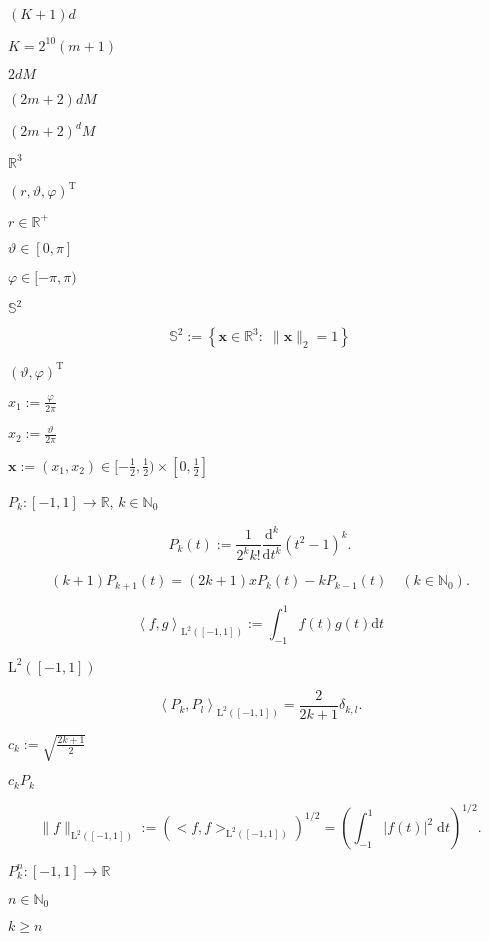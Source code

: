 \documentclass{article}
\begin{document}
$(K+1)d$
\pagebreak

$K=2^{10}(m+1)$
\pagebreak

$2dM$
\pagebreak

$(2m+2)dM$
\pagebreak

$(2m+2)^dM$
\pagebreak

$\mathbb{R}^3$
\pagebreak

$(r,\vartheta,\varphi)^{\mathrm{T}}$
\pagebreak

$r \in \mathbb{R}^{+}$
\pagebreak

$\vartheta \in [0,\pi]$
\pagebreak

$\varphi \in [-\pi,\pi)$
\pagebreak

$\mathbb{S}^2$
\pagebreak

\[ \mathbb{S}^2 := \left\{\mathbf{x} \in \mathbb{R}^{3}:\; \|\mathbf{x}\|_2=1\right\} \]
\pagebreak

$(\vartheta,\varphi)^{\mathrm{T}}$
\pagebreak

$x_1 := \frac{\varphi}{2\pi}$
\pagebreak

$x_2 := \frac{\vartheta}{2\pi}$
\pagebreak

$\mathbf{x} := \left(x_1,x_2\right) \in [-\frac{1}{2}, \frac{1}{2}) \times [0,\frac{1}{2}]$
\pagebreak

$P_k : [-1,1] \rightarrow \mathbb{R}$, $k \in \mathbb{N}_{0}$
\pagebreak

\[ P_k(t) := \frac{1}{2^k k!} \frac{\text{d}^k}{\text{d} t^k} \left(t^2-1\right)^k. \]
\pagebreak

\[ (k+1)P_{k+1}(t) = (2k+1) x P_{k}(t) - k P_{k-1}(t) \quad (k \in \mathbb{N}_0). \]
\pagebreak

\[ \left< f,g \right>_{\text{L}^2\left([-1,1]\right)} := \int_{-1}^{1} f(t) g(t) \text{d} t \]
\pagebreak

$\text{L}^2\left([-1,1]\right)$
\pagebreak

\[ \left< P_k,P_l \right>_{\text{L}^2\left([-1,1]\right)} = \frac{2}{2k+1} \delta_{k,l}. \]
\pagebreak

$ c_k := \sqrt{\frac{2k+1}{2}}$
\pagebreak

$c_k P_k$
\pagebreak

\[ \|f\|_{\text{L}^2\left([-1,1]\right)} := \left(<f,f>_{\text{L}^2\left([-1,1]\right)}\right)^{1/2} = \left(\int_{-1}^{1} |f(t)|^2 \; \text{d} t\right)^{1/2}. \]
\pagebreak

$P_k^n : [-1,1] \rightarrow \mathbb{R} $
\pagebreak

$n \in \mathbb{N}_0$
\pagebreak

$k \ge n$
\pagebreak
\end{document}
